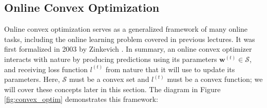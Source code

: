 \documentclass[11pt]{article}
\begin{document}
\subsection{Online Convex Optimization}

Online convex optimization serves as a generalized framework of many online tasks, including the online learning problem covered in previous lectures. It was first formalized in 2003 by Zinkevich \cite{zinkevich2003OnlineCP}. In summary, an online convex optimizer interacts with nature by producing predictions using its parameters $\boldsymbol{w}^{(t)}\in \mathcal{S}$, and receiving loss function ${l}^{(t)}$ from nature that it will use to update its parameters. Here, $\mathcal{S}$ must be a convex set and ${l}^{(t)}$ must be a convex function; we will cover these concepts later in this section. The diagram in Figure \ref{fig:convex_optim} demonstrates this framework:
\end{document}
